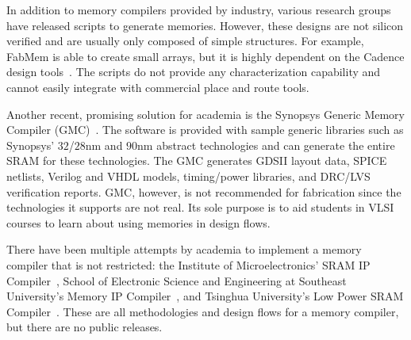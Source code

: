 In addition to memory compilers provided by industry, various research
groups have released scripts to generate memories. However, these
designs are not silicon verified and are usually only composed of
simple structures.  For example, FabMem is able to
create small arrays, but it is highly dependent on the Cadence design
tools~\cite{fabmem:2010}. The scripts do not provide any characterization capability
and cannot easily integrate with commercial place and route tools.

Another recent, promising solution for academia is the Synopsys
Generic Memory Compiler (GMC)~\cite{Goldman:2014}. The software is
provided with sample generic libraries such as Synopsys' $32$/$28$nm and
$90$nm abstract technologies and can generate the entire SRAM for these
technologies. The GMC generates GDSII layout data, SPICE netlists,
Verilog and VHDL models, timing/power libraries, and DRC/LVS
verification reports. GMC, however, is not recommended for
fabrication since the technologies it supports are not real. Its sole
purpose is to aid students in VLSI courses to learn about using
memories in design flows.

There have been multiple attempts by academia to implement a memory
compiler that is not restricted: the Institute of
Microelectronics' SRAM IP Compiler~\cite{Xu:2007}, School of
Electronic Science and Engineering at Southeast University's Memory IP
Compiler~\cite{Chen:2012}, and Tsinghua University's Low Power SRAM
Compiler~\cite{Wu:2010}. These are all methodologies and design flows
for a memory compiler, but there are no public releases.


                                                     
